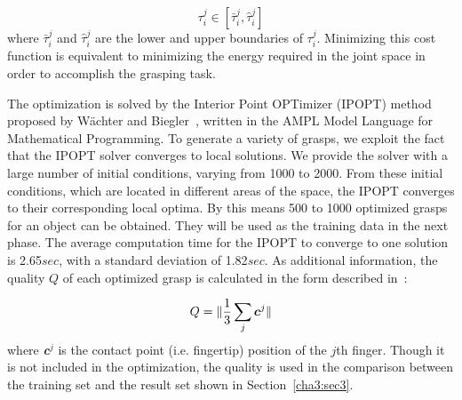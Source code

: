 \begin{equation}
 {\tau}^j_i \in [\bar{\tau}^j_i, \hat{\tau}^j_i]
 \label{quality}
\end{equation}
where $\bar{\tau}^j_i$ and $\hat{\tau}^j_i$ are the lower and upper boundaries of $\tau^j_i$.
Minimizing this cost function is equivalent to minimizing the energy required in the joint space in order to accomplish the grasping task.

The optimization is solved by the Interior Point OPTimizer (IPOPT) method proposed by W\"{a}chter and Biegler~\citep{wachter2006implementation}, written in the AMPL Model Language for Mathematical Programming. To generate a variety of grasps, we exploit the fact that the IPOPT solver converges to local solutions. We provide the solver with a large number of initial conditions, varying from 1000 to 2000. From these initial conditions, which are located in different areas of the space, the IPOPT converges to their corresponding local optima. By this means 500 to 1000 optimized grasps for an object can be obtained. They will be used as the training data in the next phase. The average computation time for the IPOPT to converge to one solution is 2.65$sec$, with a standard deviation of 1.82$sec$. As additional information, the quality $Q$ of each optimized grasp is calculated in the form described in~\citep{ponce1997computing}:

\begin{equation}
Q =\Arrowvert \frac{1}{3}\sum_{j} {\boldsymbol{c}^j}\Arrowvert
\vspace{-0.1in}
\end{equation}
where \textbf{\emph{c}}$^j$ is the contact point (i.e. fingertip) position of the $j$th finger. Though it is not included in the optimization, the quality is used in the comparison between the training set and the result set shown in Section~\ref{cha3:sec3}.


